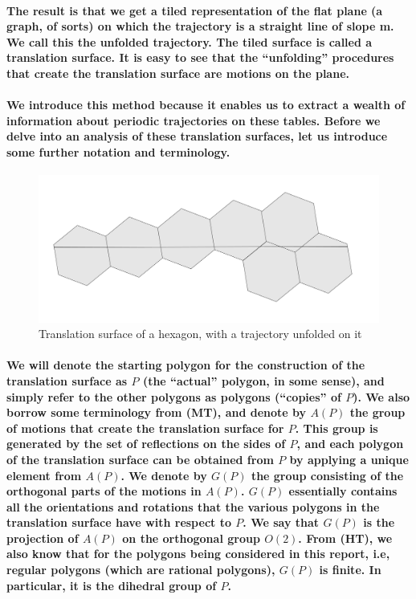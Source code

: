 \documentclass{report}
\begin{document}
\pagebreak

\paragraph{The result is that we get a tiled representation of the flat plane (a graph, of sorts) on which the trajectory is a straight line of slope m. We call this the unfolded trajectory. The tiled surface is called a translation surface. It is easy to see that the “unfolding” procedures that create the translation surface are motions on the plane.}



\paragraph{We introduce this method because it enables us to extract a wealth of information about periodic trajectories on these tables. Before we delve into an analysis of these translation surfaces, let us introduce some further notation and terminology.}

\begin{figure} 
\begin{center}
\includegraphics[scale=0.3]{10}
\caption{Translation surface of a hexagon, with a trajectory unfolded on it}
\end{center}
\end{figure}

\paragraph{We will denote the starting polygon for the construction of the translation surface as $P$ (the “actual” polygon, in some sense), and simply refer to the other polygons as polygons (“copies” of $P$). We also borrow some terminology from (MT), and denote by $A(P)$ the group of motions that create the translation surface for $P$. This group is generated by the set of reflections on the sides of $P$, and each polygon of the translation surface can be obtained from $P$ by applying a unique element from $A(P)$. We denote by $G(P)$ the group consisting of the orthogonal parts of the motions in $A(P)$. $G(P)$ essentially contains all the orientations and rotations that the various polygons in the translation surface have with respect to $P$. We say that $G(P)$ is the projection of $A(P)$ on the orthogonal group $O(2)$. From (HT), we also know that for the polygons being considered in this report, i.e, regular polygons (which are rational polygons), $G(P)$ is finite. In particular, it is the dihedral group of $P$.}
\end{document}
